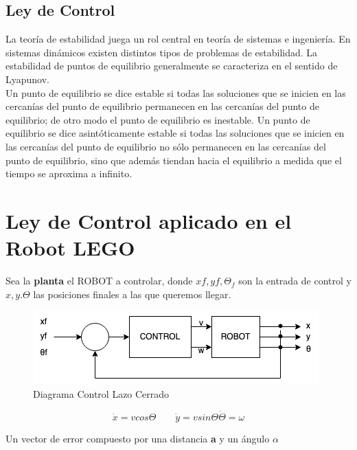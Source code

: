 \documentclass[oneside,onecolumn]{article}
\begin{document}
\subsection{Ley de Control}

La teoría de estabilidad juega un rol central en teoría de sistemas e ingeniería. En sistemas dinámicos existen distintos tipos de problemas de estabilidad. La estabilidad de puntos de equilibrio generalmente se caracteriza en el sentido de Lyapunov. \\

Un punto de equilibrio se dice estable si todas las soluciones que se inicien en las cercanías del punto de equilibrio permanecen en las cercanías del punto de equilibrio; de otro modo el punto de equilibrio es inestable. Un punto de equilibrio se dice asintóticamente estable si todas las soluciones que se inicien en las cercanías del punto de equilibrio no sólo permanecen en las cercanías del punto de equilibrio, sino que además tiendan hacia el equilibrio a medida que el tiempo se aproxima a infinito.


\section{Ley de Control aplicado en el Robot LEGO}

Sea la \textbf{planta} el ROBOT a controlar, donde $xf, yf, \Theta_{f}$ son la entrada de control y $x, y. \Theta$ las posiciones finales a las que queremos llegar.

\begin{figure}[h]
  \centering
  \includegraphics[scale=0.7]{graficos/bloque.png}
  \caption{Diagrama Control Lazo Cerrado}
\end{figure}

\[\dot{x} = v cos \Theta \qquad \dot{y} = v sin \Theta \dot{\Theta} = \omega \]

Un vector de error compuesto por una distancia \textbf{a} y un ángulo \textbf{$\alpha$} 
\end{document}
